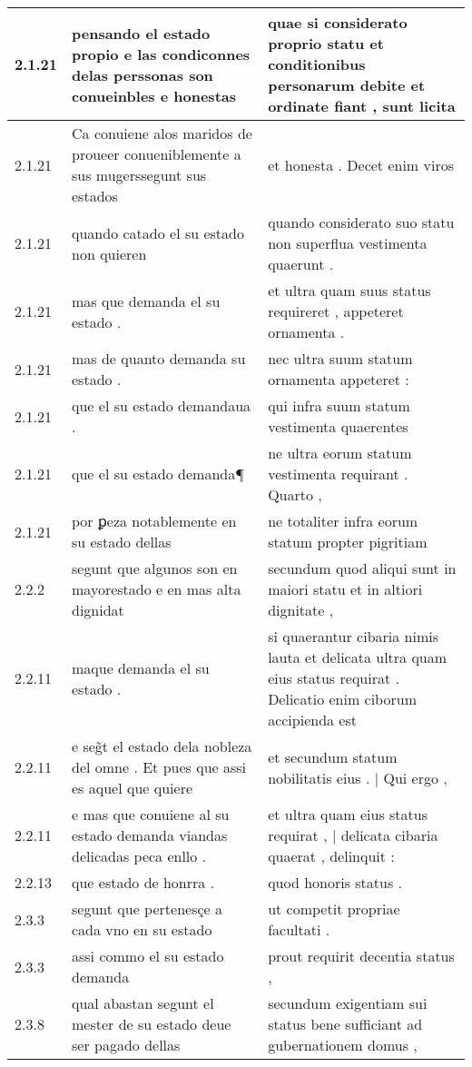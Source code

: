 \begin{tabular}{|p{1cm}|p{6.5cm}|p{6.5cm}|}
2.1.21 & pensando el estado propio e las condiconnes delas perssonas son conueinbles e honestas & quae si considerato proprio statu et conditionibus personarum debite et ordinate fiant , sunt licita \\\hline
2.1.21 & Ca conuiene alos maridos de proueer conueniblemente a sus mugerssegunt sus estados & et honesta . Decet enim viros \\\hline
2.1.21 & quando catado el su estado non quieren & quando considerato suo statu non superflua vestimenta quaerunt . \\\hline
2.1.21 & mas que demanda el su estado . & et ultra quam suus status requireret , appeteret ornamenta . \\\hline
2.1.21 & mas de quanto demanda su estado . & nec ultra suum statum ornamenta appeteret : \\\hline
2.1.21 & que el su estado demandaua . & qui infra suum statum vestimenta quaerentes \\\hline
2.1.21 & que el su estado demanda¶ & ne ultra eorum statum vestimenta requirant . Quarto , \\\hline
2.1.21 & por ꝑeza notablemente en su estado dellas & ne totaliter infra eorum statum propter pigritiam \\\hline
2.2.2 & segunt que algunos son en mayorestado e en mas alta dignidat & secundum quod aliqui sunt in maiori statu et in altiori dignitate , \\\hline
2.2.11 & maque demanda el su estado . & si quaerantur cibaria nimis lauta et delicata ultra quam eius status requirat . Delicatio enim ciborum accipienda est \\\hline
2.2.11 & e seg̃t el estado dela nobleza del omne . Et pues que assi es aquel que quiere & et secundum statum nobilitatis eius . | Qui ergo , \\\hline
2.2.11 & e mas que conuiene al su estado demanda viandas delicadas peca enllo . & et ultra quam eius status requirat , | delicata cibaria quaerat , delinquit : \\\hline
2.2.13 & que estado de honrra . & quod honoris status . \\\hline
2.3.3 & segunt que pertenesçe a cada vno en su estado & ut competit propriae facultati . \\\hline
2.3.3 & assi commo el su estado demanda & prout requirit decentia status , \\\hline
2.3.8 & qual abastan segunt el mester de su estado deue ser pagado dellas & secundum exigentiam sui status bene sufficiant ad gubernationem domus , \\\hline

\end{tabular}
